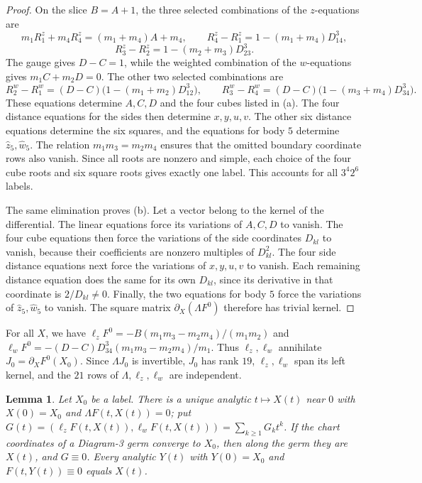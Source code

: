 \documentclass[11pt]{amsart}
\newtheorem{lemma}[theorem]{Lemma}
\theoremstyle{definition}
\theoremstyle{remark}
\begin{document}
{\begin{proof}
On the slice $B=A+1$, the three selected combinations of the $z$-equations are
\[
 m_1R^z_1+m_4R^z_4=(m_1+m_4)A+m_4,\qquad
 R^z_4-R^z_1=1-(m_1+m_4)D_{14}^3,
\]
\[
 R^z_3-R^z_2=1-(m_2+m_3)D_{23}^3.
\]
The gauge gives $D-C=1$, while the weighted combination of the $w$-equations gives
$m_1C+m_2D=0$. The other two selected combinations are
\[
 R^w_2-R^w_1=(D-C)\bigl(1-(m_1+m_2)D_{12}^3\bigr),\qquad
 R^w_3-R^w_4=(D-C)\bigl(1-(m_3+m_4)D_{34}^3\bigr).
\]
These equations determine $A,C,D$ and the four cubes listed in (a).
The four distance equations for the sides then determine $x,y,u,v$.
The other six distance equations determine the six squares, and the equations for body $5$
determine $\hat z_5,\hat w_5$.
The relation $m_1m_3=m_2m_4$ ensures that the omitted boundary coordinate rows
also vanish. Since all roots are nonzero and simple, each choice
of the four cube roots and six square roots gives exactly one label.
This accounts for all $3^4 2^6$ labels.

The same elimination proves (b). Let a vector belong to the kernel of the differential.
The linear equations force its variations of $A,C,D$ to vanish.
The four cube equations then force the variations of the side coordinates $D_{kl}$ to vanish,
because their coefficients are nonzero multiples of $D_{kl}^2$.
The four side distance equations next force the variations of $x,y,u,v$ to vanish.
Each remaining distance equation does the same for its own $D_{kl}$, since its
derivative in that coordinate is $2/D_{kl}\ne0$.
Finally, the two equations for body $5$ force the variations of $\hat z_5,\hat w_5$ to vanish.
The square matrix $\partial_X(\Lambda F^0)$ therefore has trivial kernel.
\end{proof}

}
{For all $X$, we have $\ell_zF^0=-B(m_1m_3-m_2m_4)/(m_1m_2)$ and
$\ell_wF^0=-(D-C)D_{34}^3(m_1m_3-m_2m_4)/m_1$. Thus $\ell_z,\ell_w$ annihilate
$J_0=\partial_XF^0(X_0)$. Since $\Lambda J_0$ is invertible, $J_0$ has rank $19$,
$\ell_z,\ell_w$ span its left kernel, and the $21$ rows of $\Lambda,\ell_z,\ell_w$ are independent.}

\begin{lemma}\label{lem:d3-graph}
Let $X_0$ be a label.  There is a unique analytic $t\mapsto X(t)$ near $0$ with $X(0)=X_0$ and
$\Lambda F(t,X(t))=0$; put $G(t)=(\ell_zF(t,X(t)),\ell_wF(t,X(t)))=\sum_{k\ge1}G_kt^k$.  If the
chart coordinates of a Diagram-3 germ converge to $X_0$, then along the germ they are $X(t)$, and
$G\equiv0$.  Every analytic $Y(t)$ with $Y(0)=X_0$ and $F(t,Y(t))\equiv0$ equals $X(t)$.
\end{lemma}
\end{document}
